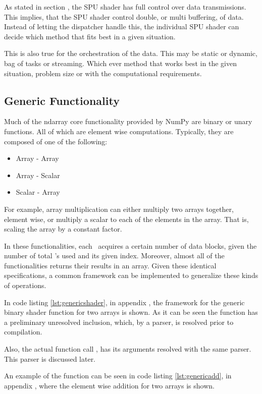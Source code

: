 As stated in section , the SPU shader has full
control over data transmissions. This implies, that the SPU shader
control double, or multi buffering, of data. Instead of letting the
dispatcher handle this, the individual SPU shader can decide which
method that fits best in a given situation.

This is also true for the orchestration of the data. This may be
static or dynamic, bag of tasks or streaming. Which ever method that
works best in the given situation, problem size or with the
computational requirements.


\subsection{Generic Functionality}
\label{sec:genericfuncs}

Much of the ndarray core functionality provided by NumPy are binary
or unary functions. All of which are element wise
computations. Typically, they are composed of one of the following:

\begin{itemize}
\item{Array - Array}
\item{Array - Scalar}
\item{Scalar - Array}
\end{itemize}

For example, array multiplication can either multiply two arrays
together, element wise, or multiply a scalar to each of the elements
in the array. That is, scaling the array by a constant factor.

In these functionalities, each \SPE\ acquires a certain number of data
blocks, given the number of total \SPE{}'s used and its given
index. Moreover, almost all of the functionalities returns their
results in an array. Given these identical specifications, a common
framework can be implemented to generalize these kinds of operations.


In code listing \ref{lst:genericshader}, in appendix
, the framework for the generic binary shader
function for two arrays is shown. As it can be seen the function has a
preliminary unresolved inclusion, which, by a parser, is resolved
prior to compilation.

Also, the actual function call , has its arguments
resolved with the same parser. This parser is discussed later.



An example of the  function can be seen in code
listing \ref{lst:genericadd}, in appendix
, where the element wise addition for
two arrays is shown.



